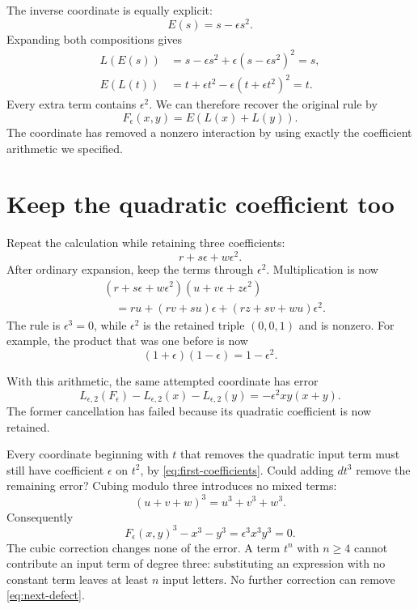 The inverse coordinate is equally explicit:
\[
 E(s)=s-\epsilon s^2.
\]
Expanding both compositions gives
\begin{align*}
 L(E(s))&=s-\epsilon s^2+\epsilon(s-\epsilon s^2)^2=s,\\
 E(L(t))&=t+\epsilon t^2-\epsilon(t+\epsilon t^2)^2=t.
\end{align*}
Every extra term contains \(\epsilon^2\). We can therefore recover the original rule by
\[
 F_\epsilon(x,y)=E(L(x)+L(y)).
\]
The coordinate has removed a nonzero interaction by using exactly the coefficient arithmetic we specified.

\section{Keep the quadratic coefficient too}\label{sec:next-order}

Repeat the calculation while retaining three coefficients:
\[
 r+s\epsilon+w\epsilon^2.
\]
After ordinary expansion, keep the terms through \(\epsilon^2\). Multiplication is now
\begin{equation}\label{eq:three-coefficients}
 \begin{split}
 &(r+s\epsilon+w\epsilon^2)(u+v\epsilon+z\epsilon^2)\\
 &\quad=ru+(rv+su)\epsilon+(rz+sv+wu)\epsilon^2.
 \end{split}
\end{equation}
The rule is \(\epsilon^3=0\), while \(\epsilon^2\) is the retained triple \((0,0,1)\) and is nonzero. For example, the product that was one before is now
\[
 (1+\epsilon)(1-\epsilon)=1-\epsilon^2.
\]

With this arithmetic, the same attempted coordinate has error
\begin{equation}\label{eq:next-defect}
 L_{\epsilon,2}(F_\epsilon)-L_{\epsilon,2}(x)-L_{\epsilon,2}(y)
 =-\epsilon^2xy(x+y).
\end{equation}
The former cancellation has failed because its quadratic coefficient is now retained.

Every coordinate beginning with \(t\) that removes the quadratic input term must still have coefficient \(\epsilon\) on \(t^2\), by \eqref{eq:first-coefficients}. Could adding \(d t^3\) remove the remaining error? Cubing modulo three introduces no mixed terms:
\[
 (u+v+w)^3=u^3+v^3+w^3.
\]
Consequently
\[
 F_\epsilon(x,y)^3-x^3-y^3=\epsilon^3x^3y^3=0.
\]
The cubic correction changes none of the error. A term \(t^n\) with \(n\ge4\) cannot contribute an input term of degree three: substituting an expression with no constant term leaves at least \(n\) input letters. No further correction can remove \eqref{eq:next-defect}.

